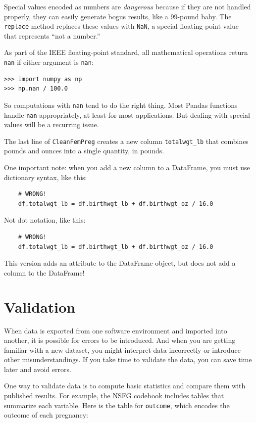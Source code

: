 \documentclass[12pt]{book}
\begin{document}
Special values encoded as numbers are {\em dangerous} because if they
are not handled properly, they can easily generate bogus results, like
a 99-pound baby.  The {\tt replace} method replaces these values with
{\tt NaN}, a special floating-point value that represents ``not a
number.''

As part of the IEEE floating-point standard, all mathematical
operations return {\tt nan} if either argument is {\tt nan}:

\begin{verbatim}
>>> import numpy as np
>>> np.nan / 100.0
\end{verbatim}

So computations with {\tt nan} tend to do the right thing.  Most
Pandas functions handle {\tt nan} appropriately, at least for most
applications.  But dealing with special values will be a recurring
issue.

The last line of {\tt CleanFemPreg} creates a new
column \verb"totalwgt_lb" that combines pounds and ounces into
a single quantity, in pounds.

One important note: when you add a new column to a DataFrame, you
must use dictionary syntax, like this:

\begin{verbatim}
    # WRONG!
    df.totalwgt_lb = df.birthwgt_lb + df.birthwgt_oz / 16.0 
\end{verbatim}

Not dot notation, like this:

\begin{verbatim}
    # WRONG!
    df.totalwgt_lb = df.birthwgt_lb + df.birthwgt_oz / 16.0 
\end{verbatim}

This version adds an attribute to the DataFrame object, but does
not add a column to the DataFrame!


\section{Validation}

When data is exported from one software environment and imported into
another, it is possible for errors to be introduced.  And when you are
getting familiar with a new dataset, you might interpret data
incorrectly or introduce other misunderstandings.  If you take
time to validate the data, you can save time later and avoid errors.

One way to validate data is to compute basic statistics and compare
them with published results.  For example, the NSFG codebook includes
tables that summarize each variable.  Here is the table for
{\tt outcome}, which encodes the outcome of each pregnancy:
\end{document}
